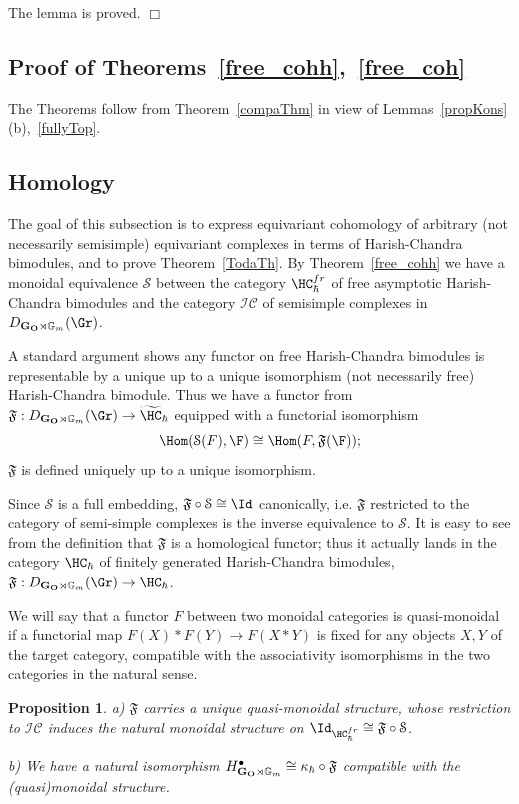 \documentclass[11pt]{amsart}
\newtheorem{prop}{Proposition}
\theoremstyle{definition}
\theoremstyle{remark}
\theoremstyle{remark}
\newcommand{\<}{\langle}
\renewcommand{\>}{\rangle}
\newcommand{\GO}{{\bf G_O}}
\newcommand{\Gm}{{{\mathbb G}_m}}
\newcommand{\HCh}{\HC_\hbar}
\newcommand{\eqss}{{\mathcal{S}}}
\newcommand{\fufu}{{\mathfrak{F}}}
\newcommand{\CatTopss}{{\mathcal{IC}}}
\newcommand{\Bimodfr}{{\HC_\hbar^{fr}}}
\newcommand{\qkap}{{\kappa_\hbar}}
\begin{document}
The lemma is proved.
\hfill $\Box$

\subsection{Proof of Theorems~\ref{free_cohh},~\ref{free_coh}}
The Theorems follow from Theorem~\ref{compaThm} in view of 
Lemmas~\ref{propKons}(b),~\ref{fullyTop}.


\subsection{Homology}
The goal of this subsection is to express equivariant cohomology of
arbitrary (not necessarily semisimple) equivariant complexes in terms
of Harish-Chandra bimodules, and to prove Theorem~\ref{TodaTh}.
By Theorem~\ref{free_cohh}
we  have  a monoidal equivalence $\eqss$ 
between the category $\HC_\hbar^{fr}$ of free asymptotic
Harish-Chandra bimodules and the category $\CatTopss$ of 
semisimple complexes in $D_{\GO\rtimes \Gm}(\Gr)$.

A standard argument shows any functor on free Harish-Chandra bimodules
is representable by a unique up to a unique isomorphism
(not necessarily free) Harish-Chandra bimodule. Thus we have 
a functor from $\fufu:D_{\GO\rtimes \Gm}(\Gr)\to \widetilde \HCh$
equipped
with a functorial isomorphism
$$\Hom(\eqss(F), \F)\cong \Hom(F,\fufu(\F));$$
$\fufu$ is defined uniquely up to a unique isomorphism.

Since $\eqss$ is a full embedding,
 $\fufu \circ \eqss\cong\Id$ canonically, i.e.
$\fufu$ restricted to the category of semi-simple complexes is the inverse
equivalence to $\eqss$.
It is easy to see from the definition that $\fufu$ is a homological functor;
thus it actually lands in the category $\HCh$ of finitely generated
Harish-Chandra bimodules,
$\fufu: D_{\GO\rtimes \Gm}(\Gr)\to \HCh$. 



We will say that  a functor $F$ between two monoidal
categories is quasi-monoidal if a functorial map 
$F(X)*F(Y)\to F(X*Y)$ is fixed for any objects $X,Y$ of the target category,
compatible with the associativity isomorphisms in the two categories in 
the natural sense.

\begin{prop}\label{fufux}
a) $\fufu$ carries a unique quasi-monoidal structure, whose
restriction to $\CatTopss$ induces the natural monoidal
structure on $\Id_{\Bimodfr}\cong \fufu \circ \eqss$.


b) We have a natural isomorphism 
$H^\bullet_{\GO\rtimes \Gm}\cong \qkap \circ \fufu$
compatible with the (quasi)monoidal structure.

\end{prop}
\end{document}
